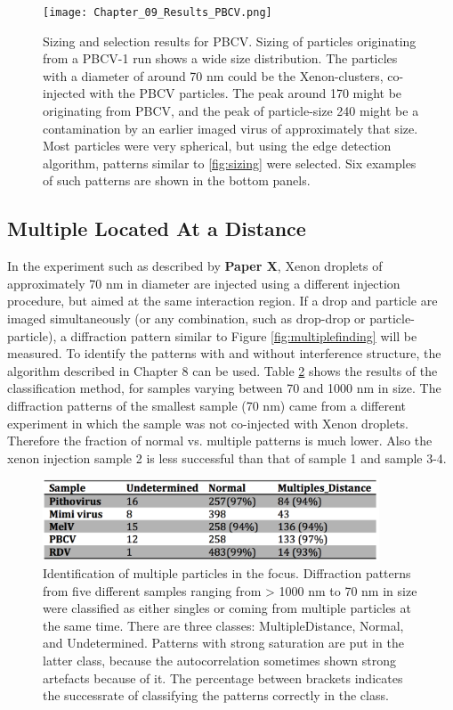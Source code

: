 \begin{figure}[!h]
\centering
\texttt{[image: Chapter\_09\_Results\_PBCV.png]}
\caption{Sizing and selection results for PBCV. Sizing of particles originating from a PBCV-1 run shows a wide size distribution. The particles with a diameter of around 70 nm could be the Xenon-clusters, co-injected with the PBCV particles. The peak around 170 might be originating from PBCV, and the peak of particle-size 240 might be a contamination by an earlier imaged virus of approximately that size. Most particles were very spherical, but using the edge detection algorithm, patterns similar to \ref{fig:sizing} were selected. Six examples of such patterns are shown in the bottom panels.}\label{fig:PatternSelection}

\end{figure}


\subsection{Multiple Located At a Distance}

In the experiment such as described by \textbf{Paper X}, Xenon droplets of approximately 70 nm in diameter are injected using a different injection procedure, but aimed at the same interaction region. If a drop and particle are imaged simultaneously (or any combination, such as drop-drop or particle-particle), a diffraction pattern similar to Figure \ref{fig:multiplefinding} will be measured. To identify the patterns with and without interference structure, the algorithm described in Chapter 8 can be used. Table \ref{fig:multiple_find} shows the results of the classification method, for samples varying between 70 and 1000 nm in size. The diffraction patterns of the smallest sample (70 nm) came from a different experiment in which the sample was not co-injected with Xenon droplets. Therefore the fraction of normal vs. multiple patterns is much lower. Also the xenon injection sample 2 is less successful than that of sample 1 and sample 3-4.

\begin{figure}[!h]
\centering
\includegraphics[width=100mm]{Chapter_09_Results_successrate.png}
\caption{Identification of multiple particles in the focus. Diffraction patterns from five different samples ranging from > 1000 nm to 70 nm in size were classified as either singles or coming from multiple particles at the same time. There are three classes: MultipleDistance, Normal, and Undetermined. Patterns with strong saturation are put in the latter class, because the autocorrelation sometimes shown strong artefacts because of it. The percentage between brackets indicates the successrate of classifying the patterns correctly in the class.}\label{fig:multiple_find}

\end{figure}

